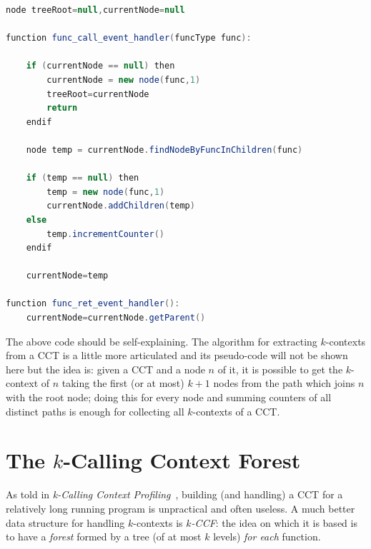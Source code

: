 \documentclass[a4paper,10pt]{report}
\begin{document}
\newpage

\begin{lstlisting}[language=java, label={cct_alg}, caption={An algorithm for building a CCT}, morekeywords={function,then,endif},frame=leftline,framesep=10pt]
node treeRoot=null,currentNode=null

function func_call_event_handler(funcType func):

	if (currentNode == null) then 	
		currentNode = new node(func,1) 
		treeRoot=currentNode
		return
	endif

	node temp = currentNode.findNodeByFuncInChildren(func)

	if (temp == null) then
		temp = new node(func,1)
		currentNode.addChildren(temp)
	else
		temp.incrementCounter()
	endif

	currentNode=temp

function func_ret_event_handler():
	currentNode=currentNode.getParent()

\end{lstlisting}

The above code should be self-explaining.
The algorithm for extracting $k$-contexts from a CCT is a little more articulated 
and its pseudo-code will not be shown here but the idea is: given a CCT and a node $n$ of it, it is possible to get the $k$-context of $n$ taking the first (or at most) $k+1$ nodes from the path which joins $n$ with the root node; doing this for every node and summing counters of all distinct paths is enough for collecting all $k$-contexts of a CCT.

\section{The $k$-Calling Context Forest}

As told in \emph{k-Calling Context Profiling}~\cite{kccf}, building (and handling) a CCT for a relatively long running program is unpractical and often useless.
A much better data structure for handling $k$-contexts is \emph{$k$-CCF}: 
the idea on which it is based is to have a \emph{forest} formed by 
a tree (of at most $k$ levels) \emph{for each} function. 
\end{document}
